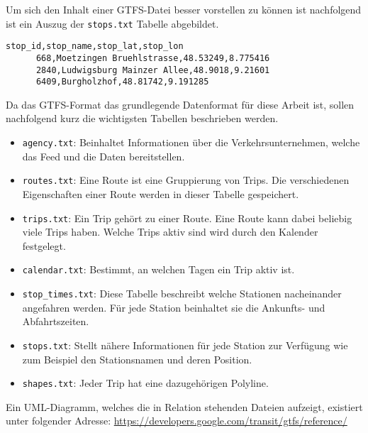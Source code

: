 \begin{newpage}
    Um sich den Inhalt einer GTFS-Datei besser vorstellen zu können ist nachfolgend ist ein Auszug der \texttt{stops.txt} Tabelle abgebildet.

    \begin{lstlisting}[captionpos=b, caption=Auszug der ersten Zeilen von \texttt{stops.txt}, label=lst:gtfs-auszug]
      stop_id,stop_name,stop_lat,stop_lon
      668,Moetzingen Bruehlstrasse,48.53249,8.775416
      2840,Ludwigsburg Mainzer Allee,48.9018,9.21601
      6409,Burgholzhof,48.81742,9.191285
    \end{lstlisting}

		Da das GTFS-Format das grundlegende Datenformat für diese Arbeit ist, sollen nachfolgend kurz die wichtigsten Tabellen beschrieben werden.

		\begin{itemize}
			\item \texttt{agency.txt}: Beinhaltet Informationen über die Verkehrsunternehmen, welche das Feed und die Daten bereitstellen.

			\item \texttt{routes.txt}: Eine Route ist eine Gruppierung von Trips. Die verschiedenen Eigenschaften einer Route werden in dieser Tabelle gespeichert.

			\item \texttt{trips.txt}: Ein Trip gehört zu einer Route. Eine Route kann dabei beliebig viele Trips haben. Welche Trips aktiv sind wird durch den Kalender festgelegt.

			\item \texttt{calendar.txt}: Bestimmt, an welchen Tagen ein Trip aktiv ist.

			\item \texttt{stop\_times.txt}: Diese Tabelle beschreibt welche Stationen nacheinander angefahren werden. Für jede Station beinhaltet sie die Ankunfts- und Abfahrtszeiten.

			\item \texttt{stops.txt}: Stellt nähere Informationen für jede Station zur Verfügung wie zum Beispiel den Stationsnamen und deren Position.

			\item \texttt{shapes.txt}: Jeder Trip hat eine dazugehörigen Polyline.

		\end{itemize}

  Ein UML-Diagramm, welches die in Relation stehenden Dateien aufzeigt, existiert unter folgender Adresse: \url{https://developers.google.com/transit/gtfs/reference/} 

\end{newpage}

